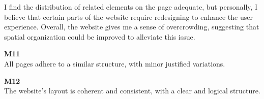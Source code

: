 \begin{description}
    I find the distribution of related elements on the page adequate, but personally, I believe that certain parts of the website require redesigning to enhance the user experience. 
    Overall, the website gives me a sense of overcrowding, suggesting that spatial organization could be improved to alleviate this issue.
    \item {\textbf{M11} \color{unicefGray}{Consistency of the page structure}}\\
    All pages adhere to a similar structure, with minor justified variations.
    \item {\textbf{M12} \color{unicefGray}{Coherence in page layout}}\\
    The website's layout is coherent and consistent, with a clear and logical structure.
\end{description}


